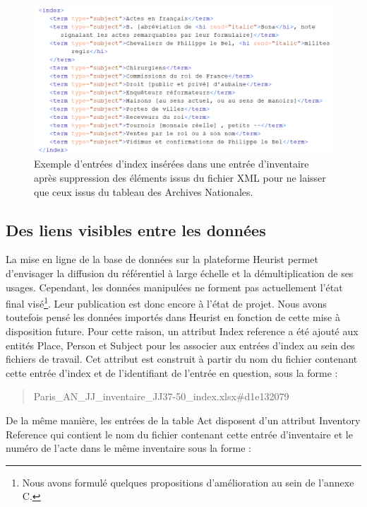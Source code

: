 \documentclass[a4paper,12pt,twoside]{book}
\begin{document}
	\begin{figure}
		\centering
		\includegraphics[width=\textwidth]{Images/Subects_in_inventaire.png}
		\caption{Exemple d'entrées d'index insérées dans une entrée d'inventaire après suppression des éléments issus du fichier XML pour ne laisser que ceux issus du tableau des Archives Nationales.}
		\label{Subjects_in_inventory}
	\end{figure}
	
	\subsection{Des liens visibles entre les données}
	
	La mise en ligne de la base de données sur la plateforme Heurist permet d'envisager la diffusion du référentiel à large échelle et la démultiplication de ses usages. Cependant, les données manipulées ne forment pas actuellement l'état final visé\footnote{Nous avons formulé quelques propositions d'amélioration au sein de l'annexe C.}. Leur publication est donc encore à l'état de projet. Nous avons toutefois pensé les données importés dans Heurist en fonction de cette mise à disposition future. Pour cette raison, un attribut \og Index reference\fg{} a été ajouté aux entités Place, Person et Subject pour les associer aux entrées d'index au sein des fichiers de travail. Cet attribut est construit à partir du nom du fichier contenant cette entrée d'index et de l'identifiant de l'entrée en question, sous la forme :
	
	
	\begin{quotation}
		Paris\_AN\_JJ\_inventaire\_JJ37-50\_index.xlsx\#d1e132079
	\end{quotation}
	
	De la même manière, les entrées de la table Act disposent d'un attribut \og Inventory Reference\fg{} qui contient le nom du fichier contenant cette entrée d'inventaire et le numéro de l'acte dans le même inventaire sous la forme :
	
\end{document}
